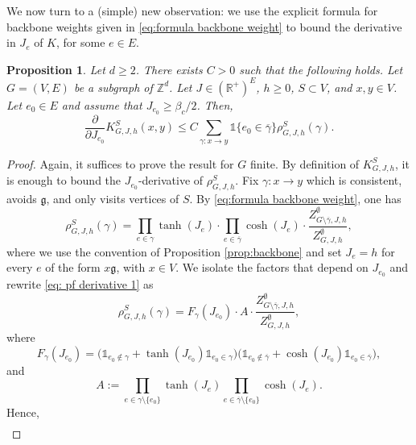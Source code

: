 \documentclass[11pt,a4paper]{article}
\numberwithin{equation}{section}
\theoremstyle{plain}
\newtheorem{Prop}[Thm]{Proposition}
\theoremstyle{definition}
\newcommand\fg{\mathfrak{g}}
\begin{document}
We now turn to a (simple) new observation: we use the explicit formula for backbone weights given in \eqref{eq:formula backbone weight} to bound the derivative in $J_e$ of $K$, for some $e\in E$. 
\begin{Prop}\label{prop: derivative K} Let $d\geq 2$. There exists $C>0$ such that the following holds. Let $G=(V,E)$ be a subgraph of $\mathbb Z^d$.  Let $J\in (\mathbb R^+)^E$, $h\geq 0$, $S\subset V$, and $x,y\in V$. Let $e_0\in E$ and assume that $J_{e_0}\geq \beta_c/2$. Then,
\begin{equation}
	\frac{\partial}{\partial J_{e_0}}K_{G,J,h}^S(x,y)\leq C\sum_{\gamma:x\rightarrow y}\mathds{1}\{e_0\in \overline{\gamma}\}\rho_{G,J,h}^S(\gamma).
\end{equation}
\end{Prop}
\begin{proof} Again, it suffices to prove the result for $G$ finite. By definition of $K_{G,J,h}^S$, it is enough to bound the $J_{e_0}$-derivative of $\rho_{G,J,h}^S$. Fix $\gamma:x\rightarrow y$ which is consistent, avoids $\mathfrak{g}$, and only visits vertices of $S$. By \eqref{eq:formula backbone weight}, one has
\begin{equation}\label{eq: pf derivative 1}
	\rho_{G,J,h}^S(\gamma)=\prod_{e\in \gamma}\tanh(J_e) \cdot \prod_{e\in \overline{\gamma}}\cosh(J_e)\cdot \frac{Z_{G\setminus \overline{\gamma},J,h}^\emptyset}{Z_{G,J,h}^\emptyset},
\end{equation}
where we use the convention of Proposition \ref{prop:backbone} and set $J_e=h$ for every $e$ of the form $x\fg$, with $x\in V$.
We isolate the factors that depend on $J_{e_0}$ and rewrite \eqref{eq: pf derivative 1} as
\begin{equation}
	\rho_{G,J,h}^S(\gamma)=F_\gamma(J_{e_0})\cdot A \cdot \frac{Z_{G\setminus \overline{\gamma},J,h}^\emptyset}{Z_{G,J,h}^\emptyset},
\end{equation}
where
\begin{equation}
	F_\gamma(J_{e_0})=\big(\mathds{1}_{e_0\notin \gamma}+\tanh(J_{e_0})\mathds{1}_{e_0\in \gamma}\big)\big(\mathds{1}_{e_0\notin \overline{\gamma}}+\cosh(J_{e_0})\mathds{1}_{e_0\in \overline{\gamma}}\big),
\end{equation}
and
\begin{equation}
	A:=\prod_{e\in \gamma\setminus\{e_0\}}\tanh(J_e)\prod_{e\in \overline{\gamma}\setminus \{e_0\}}\cosh(J_e).
\end{equation}
Hence,
\begin{align}\label{eq: pf derivative 2}

\end{align}
\end{proof}
\end{document}
